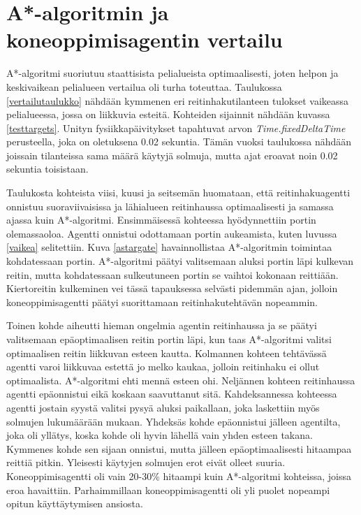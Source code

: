 \documentclass[utf8]{gradu3}
\begin{document}
\section{A*-algoritmin ja koneoppimisagentin vertailu}
\label{vertailu}

A*-algoritmi suoriutuu staattisista pelialueista optimaalisesti, joten helpon ja keskivaikean pelialueen vertailua oli turha toteuttaa. Taulukossa \ref{vertailutaulukko} nähdään kymmenen eri reitinhakutilanteen tulokset vaikeassa pelialueessa, jossa on liikkuvia esteitä. Kohteiden sijainnit nähdään kuvassa \ref{testtargets}. Unityn fysiikkapäivitykset tapahtuvat arvon \textit{Time.fixedDeltaTime} perusteella, joka on oletuksena 0.02 sekuntia. Tämän vuoksi taulukossa nähdään joissain tilanteissa sama määrä käytyjä solmuja, mutta ajat eroavat noin 0.02 sekuntia toisistaan.

Taulukosta kohteista viisi, kuusi ja seitsemän huomataan, että reitinhakuagentti onnistuu suoraviivaisissa ja lähialueen reitinhaussa optimaalisesti ja samassa ajassa kuin A*-algoritmi. Ensimmäisessä kohteessa hyödynnettiin portin olemassaoloa. Agentti onnistui odottamaan portin aukeamista, kuten luvussa \ref{vaikea} selitettiin. Kuva \ref{astargate} havainnollistaa A*-algoritmin toimintaa kohdatessaan portin. A*-algoritmi päätyi valitsemaan aluksi portin läpi kulkevan reitin, mutta kohdatessaan sulkeutuneen portin se vaihtoi kokonaan reittiään. Kiertoreitin kulkeminen vei tässä tapauksessa selvästi pidemmän ajan, jolloin koneoppimisagentti päätyi suorittamaan reitinhakutehtävän nopeammin.

Toinen kohde aiheutti hieman ongelmia agentin reitinhaussa ja se päätyi valitsemaan epäoptimaalisen reitin portin läpi, kun taas A*-algoritmi valitsi optimaalisen reitin liikkuvan esteen kautta. Kolmannen kohteen tehtävässä agentti varoi liikkuvaa estettä jo melko kaukaa, jolloin reitinhaku ei ollut optimaalista. A*-algoritmi ehti mennä esteen ohi. Neljännen kohteen reitinhaussa agentti epäonnistui eikä koskaan saavuttanut sitä. Kahdeksannessa kohteessa agentti jostain syystä valitsi pysyä aluksi paikallaan, joka laskettiin myös solmujen lukumäärään mukaan. Yhdeksäs kohde epäonnistui jälleen agentilta, joka oli yllätys, koska kohde oli hyvin lähellä vain yhden esteen takana. Kymmenes kohde sen sijaan onnistui, mutta jälleen epäoptimaalisesti hitaampaa reittiä pitkin. Yleisesti käytyjen solmujen erot eivät olleet suuria. Koneoppimisagentti oli vain 20-30\% hitaampi kuin A*-algoritmi kohteissa, joissa eroa havaittiin. Parhaimmillaan koneoppimisagentti oli yli puolet nopeampi opitun käyttäytymisen ansiosta.
\end{document}
